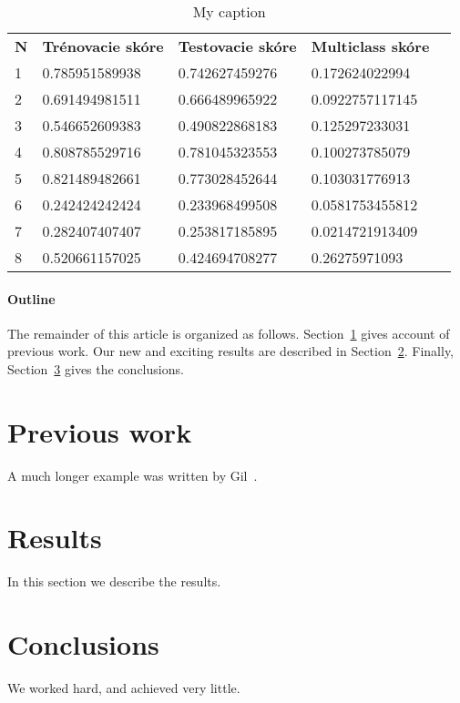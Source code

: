 \documentclass[12pt]{article}
\begin{document}
\begin{table}[]
\centering
\caption{My caption}
\label{my-label}
\begin{tabular}{lllll}
\textbf{N} & \textbf{Trénovacie skóre} & \textbf{Testovacie skóre} & \textbf{Multiclass skóre} & \textbf{} \\
1          & 0.785951589938            & 0.742627459276            & 0.172624022994            &           \\
2          & 0.691494981511            & 0.666489965922            & 0.0922757117145           &           \\
3          & 0.546652609383            & 0.490822868183            & 0.125297233031            &         \\
4          & 0.808785529716            & 0.781045323553            & 0.100273785079            &           \\
5          & 0.821489482661            & 0.773028452644            & 0.103031776913          &           \\
6          & 0.242424242424            & 0.233968499508            & 0.0581753455812            &         \\ 
7          & 0.282407407407            & 0.253817185895            & 0.0214721913409          &           \\
8          & 0.520661157025            & 0.424694708277            & 0.26275971093            &         \\ 
\end{tabular}
\end{table}



\paragraph{Outline}
The remainder of this article is organized as follows.
Section~\ref{previous work} gives account of previous work.
Our new and exciting results are described in Section~\ref{results}.
Finally, Section~\ref{conclusions} gives the conclusions.

\section{Previous work}\label{previous work}
A much longer \LaTeXe{} example was written by Gil~\cite{Gil:02}.

\section{Results}\label{results}
In this section we describe the results.

\section{Conclusions}\label{conclusions}
We worked hard, and achieved very little.



\end{document}
